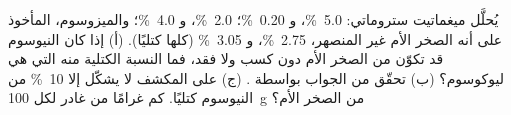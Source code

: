\begin{exercise}[$\star\star\star$]\label{exo:b2:crustal-melting:12}
يُحلَّل ميغماتيت ستروماتي:   \qty{5.0}{\percent}، و
\qty{0.20}{\percent}؛   \qty{2.0}{\percent}، و
\qty{4.0}{\percent}؛ والميزوسوم، المأخوذ على أنه الصخر الأم غير المنصهر، 
\qty{2.75}{\percent}، و \qty{3.05}{\percent} (كلها كتليًا). (أ) إذا كان
النيوسوم قد تكوّن من الصخر الأم دون كسب ولا فقد، فما النسبة الكتلية منه التي هي
ليوكوسوم؟ (ب) تحقّق من الجواب بواسطة . (ج) على المكشف لا يشكّل  إلا
\qty{10}{\percent} من النيوسوم كتليًا. كم غرامًا من  غادر لكل
\qty{100}{\gram} من الصخر الأم؟
\end{exercise}

